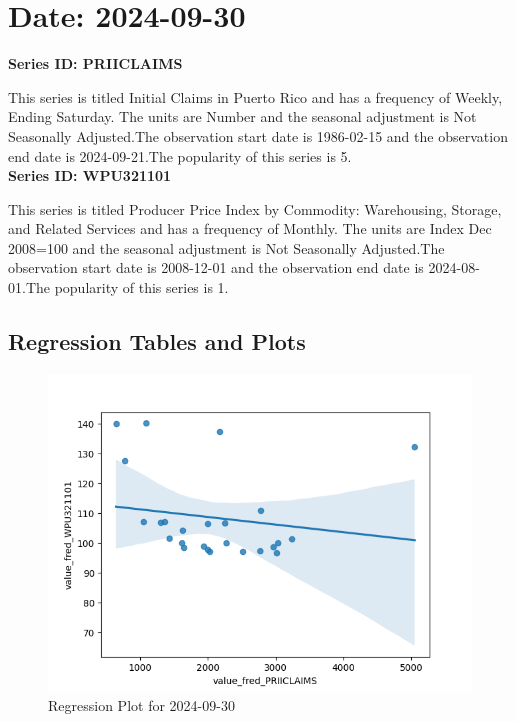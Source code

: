 \section{Date: 2024-09-30}
\noindent \textbf{Series ID: PRIICLAIMS} 

\noindent This series is titled Initial Claims in Puerto Rico and has a frequency of Weekly, Ending Saturday. The units are Number and the seasonal adjustment is Not Seasonally Adjusted.The observation start date is 1986-02-15 and the observation end date is 2024-09-21.The popularity of this series is 5. \\ 

\noindent \textbf{Series ID: WPU321101} 

\noindent This series is titled Producer Price Index by Commodity: Warehousing, Storage, and Related Services and has a frequency of Monthly. The units are Index Dec 2008=100 and the seasonal adjustment is Not Seasonally Adjusted.The observation start date is 2008-12-01 and the observation end date is 2024-08-01.The popularity of this series is 1. \\ 

\subsection{Regression Tables and Plots}


\begin{figure}
\centering
\includegraphics[scale = 0.9]{plots/plot_2024-09-30.png}
\caption{Regression Plot for 2024-09-30}
\end{figure}
\newpage
